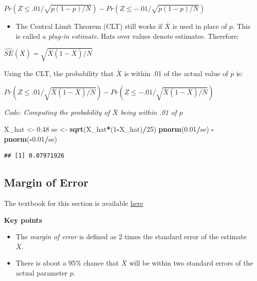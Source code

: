 \documentclass[
]{article}
\newenvironment{Shaded}{\begin{snugshade}}{\end{snugshade}}
\newcommand{\DecValTok}[1]{\textcolor[rgb]{0.00,0.00,0.81}{#1}}
\newcommand{\FloatTok}[1]{\textcolor[rgb]{0.00,0.00,0.81}{#1}}
\newcommand{\KeywordTok}[1]{\textcolor[rgb]{0.13,0.29,0.53}{\textbf{#1}}}
\newcommand{\NormalTok}[1]{#1}
\newcommand{\OperatorTok}[1]{\textcolor[rgb]{0.81,0.36,0.00}{\textbf{#1}}}
\newcommand{\StringTok}[1]{\textcolor[rgb]{0.31,0.60,0.02}{#1}}
\providecommand{\tightlist}{%
  \setlength{\itemsep}{0pt}\setlength{\parskip}{0pt}}
\begin{document}
\(Pr(Z \le .01/\sqrt {p(1 - p)/N}) - Pr(Z \le -.01/\sqrt {p(1 - p)/N})\)

\begin{itemize}
\tightlist
\item
  The Central Limit Theorem (CLT) still works if \(\overline{X}\) is
  used in place of \(p\). This is called a \emph{plug-in estimate}. Hats
  over values denote estimates. Therefore:
\end{itemize}

\(\hat{SE}(\overline{X}) = \sqrt{\overline{X}(1 - \overline{X})/N}\)

Using the CLT, the probability that \(\overline{X}\) is within .01 of
the actual value of \(p\) is:

\(Pr(Z \le .01/\sqrt {\overline{X}(1 - \overline{X})/N}) - Pr(Z \le -.01/\sqrt {\overline{X}(1 - \overline{X})/N})\)

\emph{Code: Computing the probability of \(\overline{X}\) being within
.01 of \(p\)}

\begin{Shaded}
\begin{Highlighting}[]
\NormalTok{X\_hat \textless{}{-}}\StringTok{ }\FloatTok{0.48}
\NormalTok{se \textless{}{-}}\StringTok{ }\KeywordTok{sqrt}\NormalTok{(X\_hat}\OperatorTok{*}\NormalTok{(}\DecValTok{1}\OperatorTok{{-}}\NormalTok{X\_hat)}\OperatorTok{/}\DecValTok{25}\NormalTok{)}
\KeywordTok{pnorm}\NormalTok{(}\FloatTok{0.01}\OperatorTok{/}\NormalTok{se) }\OperatorTok{{-}}\StringTok{ }\KeywordTok{pnorm}\NormalTok{(}\OperatorTok{{-}}\FloatTok{0.01}\OperatorTok{/}\NormalTok{se)}
\end{Highlighting}
\end{Shaded}

\begin{verbatim}
## [1] 0.07971926
\end{verbatim}

\hypertarget{margin-of-error}{%
\subsection{Margin of Error}\label{margin-of-error}}

The textbook for this section is available
\href{https://rafalab.github.io/dsbook/inference.html\#clt}{here}

\textbf{Key points}

\begin{itemize}
\tightlist
\item
  The \emph{margin of error} is defined as 2 times the standard error of
  the estimate \(\overline{X}\).
\item
  There is about a 95\% chance that \(\overline{X}\) will be within two
  standard errors of the actual parameter \(p\).
\end{itemize}
\end{document}
